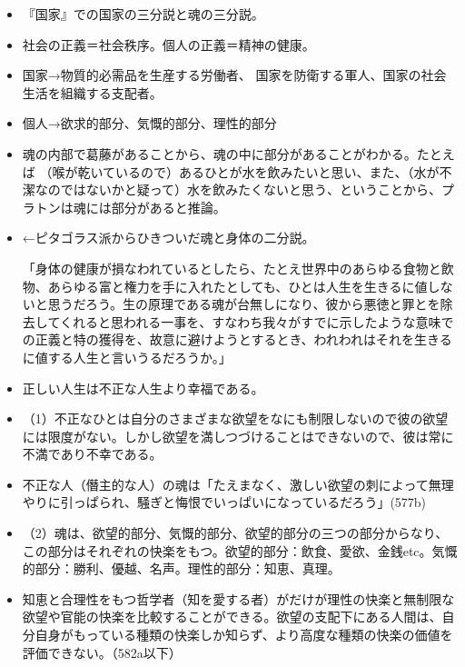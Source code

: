\documentclass[dvipdfmx]{bxjsarticle}
\begin{document}
\begin{itemize}

\item 『国家』での国家の三分説と魂の三分説。

\item 社会の正義＝社会秩序。個人の正義＝精神の健康。

\item 国家→物質的必需品を生産する労働者、
  国家を防衛する軍人、国家の社会生活を組織する支配者。


\item 個人→欲求的部分、気慨的部分、理性的部分

\item 魂の内部で葛藤があることから、魂の中に部分があることがわかる。たとえば （喉が乾いているので）あるひとが水を飲みたいと思い、また、（水が不潔なのではないかと疑って）水を飲みたくないと思う、ということから、プラトンは魂には部分があると推論。
\item ←ピタゴラス派からひきついだ魂と身体の二分説。

  「身体の健康が損なわれているとしたら、たとえ世界中のあらゆる食物と飲物、あらゆる富と権力を手に入れたとしても、ひとは人生を生きるに値しないと思うだろう。生の原理である魂が台無しになり、彼から悪徳と罪とを除去してくれると思われる一事を、すなわち我々がすでに示したような意味での正義と特の獲得を、故意に避けようとするとき、われわれはそれを生きるに値する人生と言いうるだろうか。」
\item 正しい人生は不正な人生より幸福である。

\item （1）不正なひとは自分のさまざまな欲望をなにも制限しないので彼の欲望には限度がない。しかし欲望を満しつづけることはできないので、彼は常に不満であり不幸である。

\item 不正な人（僭主的な人）の魂は「たえまなく、激しい欲望の刺によって無理やりに引っぱられ、騒ぎと悔恨でいっぱいになっているだろう」(577b)


\item （2）魂は、欲望的部分、気慨的部分、欲望的部分の三つの部分からなり、この部分はそれぞれの快楽をもつ。欲望的部分：飲食、愛欲、金銭etc。気慨的部分：勝利、優越、名声。理性的部分：知恵、真理。


\item 知恵と合理性をもつ哲学者（知を愛する者）がだけが理性の快楽と無制限な欲望や官能の快楽を比較することができる。欲望の支配下にある人間は、自分自身がもっている種類の快楽しか知らず、より高度な種類の快楽の価値を評価できない。（582a以下）


\end{itemize}
\end{document}
